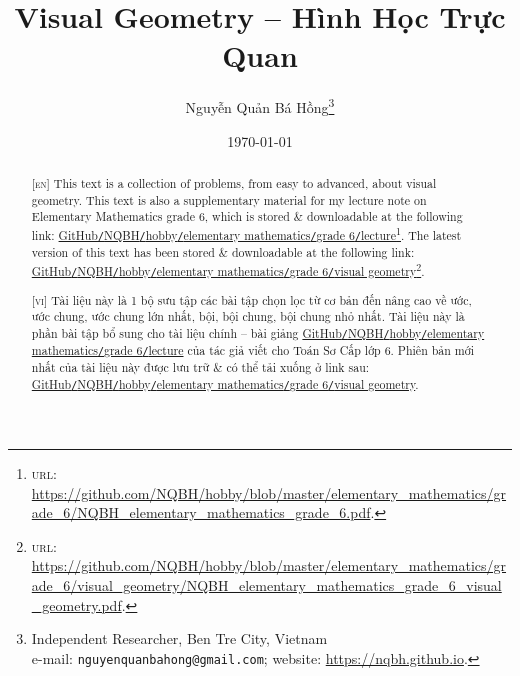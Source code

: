 \documentclass{article}
\title{Visual Geometry -- Hình Học Trực Quan}
\author{Nguyễn Quản Bá Hồng\footnote{Independent Researcher, Ben Tre City, Vietnam\\e-mail: \texttt{nguyenquanbahong@gmail.com}; website: \url{https://nqbh.github.io}.}}
\date{\today}
\numberwithin{equation}{section}
\begin{document}
\maketitle
\begin{abstract}
	\textsc{[en]} This text is a collection of problems, from easy to advanced, about visual geometry. This text is also a supplementary material for my lecture note on Elementary Mathematics grade 6, which is stored \& downloadable at the following link: \href{https://github.com/NQBH/hobby/blob/master/elementary_mathematics/grade_6/NQBH_elementary_mathematics_grade_6.pdf}{GitHub\texttt{/}NQBH\texttt{/}hobby\texttt{/}elementary mathematics\texttt{/}grade 6\texttt{/}lecture}\footnote{\textsc{url}: \url{https://github.com/NQBH/hobby/blob/master/elementary_mathematics/grade_6/NQBH_elementary_mathematics_grade_6.pdf}.}. The latest version of this text has been stored \& downloadable at the following link: \href{https://github.com/NQBH/hobby/blob/master/elementary_mathematics/grade_6/visual_geometry/NQBH_elementary_mathematics_grade_6_visual_geometry.pdf}{GitHub\texttt{/}NQBH\texttt{/}hobby\texttt{/}elementary mathematics\texttt{/}grade 6\texttt{/}visual geometry}\footnote{\textsc{url}: \url{https://github.com/NQBH/hobby/blob/master/elementary_mathematics/grade_6/visual_geometry/NQBH_elementary_mathematics_grade_6_visual_geometry.pdf}.}.
	\vspace{2mm}
	
	\textsc{[vi]} Tài liệu này là 1 bộ sưu tập các bài tập chọn lọc từ cơ bản đến nâng cao về ước, ước chung, ước chung lớn nhất, bội, bội chung, bội chung nhỏ nhất. Tài liệu này là phần bài tập bổ sung cho tài liệu chính -- bài giảng \href{https://github.com/NQBH/hobby/blob/master/elementary_mathematics/grade_6/NQBH_elementary_mathematics_grade_6.pdf}{GitHub\texttt{/}NQBH\texttt{/}hobby\texttt{/}elementary mathematics\texttt{/}grade 6\texttt{/}lecture} của tác giả viết cho Toán Sơ Cấp lớp 6. Phiên bản mới nhất của tài liệu này được lưu trữ \& có thể tải xuống ở link sau: \href{https://github.com/NQBH/hobby/blob/master/elementary_mathematics/grade_6/visual_geometry/NQBH_elementary_mathematics_grade_6_visual_geometry.pdf}{GitHub\texttt{/}NQBH\texttt{/}hobby\texttt{/}elementary mathematics\texttt{/}grade 6\texttt{/}visual geometry}.
\end{abstract}
\setcounter{secnumdepth}{4}
\setcounter{tocdepth}{3}
\tableofcontents
\newpage

\end{document}
